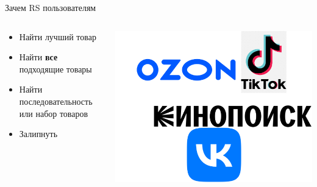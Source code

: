\documentclass[11pt,aspectratio=169,handout]{beamer}
\begin{document}
\begin{frame}{Зачем RS пользователям}

\begin{columns}

\begin{column}{0.45\textwidth}
   \begin{small}
    \begin{itemize}[<+->]
	\item Найти лучший товар
	\item Найти {\bf все} подходящие товары
	\item Найти последовательность или набор товаров
	\item Залипнуть
	\end{itemize}
    \end{small}
\end{column}

\begin{column}{0.45\textwidth}
   \begin{center}
		\includegraphics[scale=0.25]{images/logos-ru.png}
   \end{center}
\end{column}

\end{columns}

\end{frame}
\end{document}
